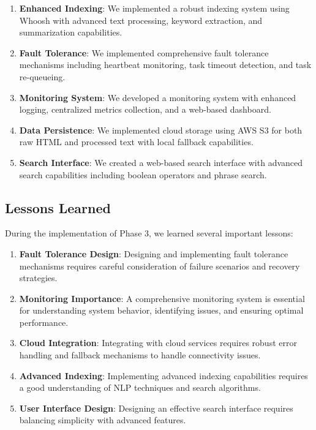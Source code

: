 \documentclass[12pt]{article}
\begin{document}
\begin{enumerate}
    \item \textbf{Enhanced Indexing}: We implemented a robust indexing system using Whoosh with advanced text processing, keyword extraction, and summarization capabilities.
    \item \textbf{Fault Tolerance}: We implemented comprehensive fault tolerance mechanisms including heartbeat monitoring, task timeout detection, and task re-queueing.
    \item \textbf{Monitoring System}: We developed a monitoring system with enhanced logging, centralized metrics collection, and a web-based dashboard.
    \item \textbf{Data Persistence}: We implemented cloud storage using AWS S3 for both raw HTML and processed text with local fallback capabilities.
    \item \textbf{Search Interface}: We created a web-based search interface with advanced search capabilities including boolean operators and phrase search.
\end{enumerate}

\subsection{Lessons Learned}
During the implementation of Phase 3, we learned several important lessons:

\begin{enumerate}
    \item \textbf{Fault Tolerance Design}: Designing and implementing fault tolerance mechanisms requires careful consideration of failure scenarios and recovery strategies.
    \item \textbf{Monitoring Importance}: A comprehensive monitoring system is essential for understanding system behavior, identifying issues, and ensuring optimal performance.
    \item \textbf{Cloud Integration}: Integrating with cloud services requires robust error handling and fallback mechanisms to handle connectivity issues.
    \item \textbf{Advanced Indexing}: Implementing advanced indexing capabilities requires a good understanding of NLP techniques and search algorithms.
    \item \textbf{User Interface Design}: Designing an effective search interface requires balancing simplicity with advanced features.
\end{enumerate}
\end{document}
